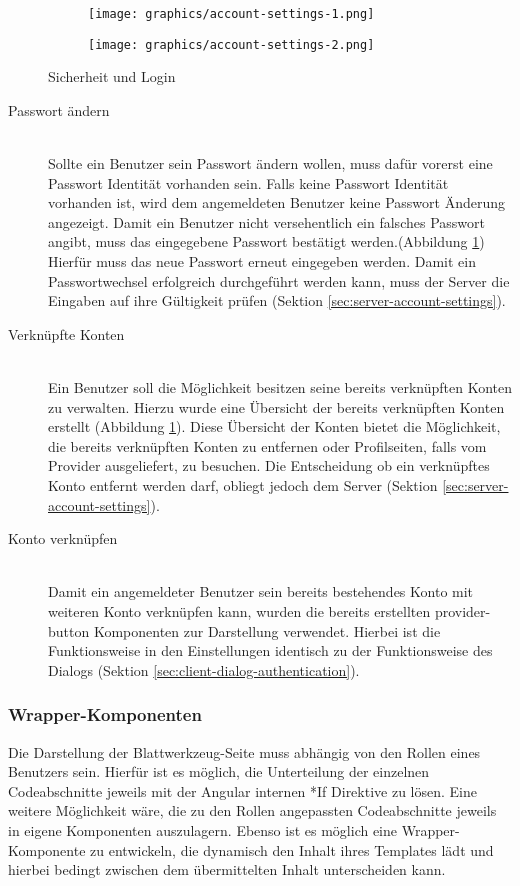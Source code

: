 \begin{figure}[h]
	\centering
	\begin{subfigure}{.5\textwidth}
		\texttt{[image: graphics/account-settings-1.png]}
	\end{subfigure}%
	\begin{subfigure}{.5\textwidth}
		\texttt{[image: graphics/account-settings-2.png]}
	\end{subfigure}
	\caption{Sicherheit und Login}
	\label{fig:account_settings}
\end{figure}


\begin{description}
	\item[Passwort ändern]\hfill\\
	Sollte ein Benutzer sein Passwort ändern wollen, muss dafür vorerst eine Passwort Identität vorhanden sein. Falls keine Passwort Identität vorhanden ist, wird dem angemeldeten Benutzer keine Passwort Änderung angezeigt. Damit ein Benutzer nicht versehentlich ein falsches Passwort angibt, muss das eingegebene Passwort bestätigt werden.(Abbildung \ref{fig:account_settings}) Hierfür muss das neue Passwort erneut eingegeben werden. Damit ein Passwortwechsel erfolgreich durchgeführt werden kann, muss der Server die Eingaben auf ihre Gültigkeit prüfen (Sektion \ref{sec:server-account-settings}).
	\item[Verknüpfte Konten]\hfill\\
	Ein Benutzer soll die Möglichkeit besitzen seine bereits verknüpften Konten zu verwalten. Hierzu wurde eine Übersicht der bereits verknüpften Konten erstellt (Abbildung \ref{fig:account_settings}). Diese Übersicht der Konten bietet die Möglichkeit, die bereits verknüpften Konten zu entfernen oder Profilseiten, falls vom Provider ausgeliefert, zu besuchen. Die Entscheidung ob ein verknüpftes Konto entfernt werden darf, obliegt jedoch dem Server (Sektion \ref{sec:server-account-settings}).
	\item[Konto verknüpfen]\hfill\\
	Damit ein angemeldeter Benutzer sein bereits bestehendes Konto mit weiteren Konto verknüpfen kann, wurden die bereits erstellten provider-button Komponenten zur Darstellung verwendet. Hierbei ist die Funktionsweise in den Einstellungen identisch zu der Funktionsweise des Dialogs (Sektion \ref{sec:client-dialog-authentication}).
\end{description}

\subsubsection{Wrapper-Komponenten}
\label{sec:client-wrapper-components}
Die Darstellung der Blattwerkzeug-Seite muss abhängig von den Rollen eines Benutzers sein. Hierfür ist es möglich, die Unterteilung der einzelnen Codeabschnitte jeweils mit der Angular internen *If Direktive zu lösen. Eine weitere Möglichkeit wäre, die zu den Rollen angepassten Codeabschnitte jeweils in eigene Komponenten auszulagern. Ebenso ist es möglich eine Wrapper-Komponente zu entwickeln, die dynamisch den Inhalt ihres Templates lädt und hierbei bedingt zwischen dem übermittelten Inhalt unterscheiden kann.

